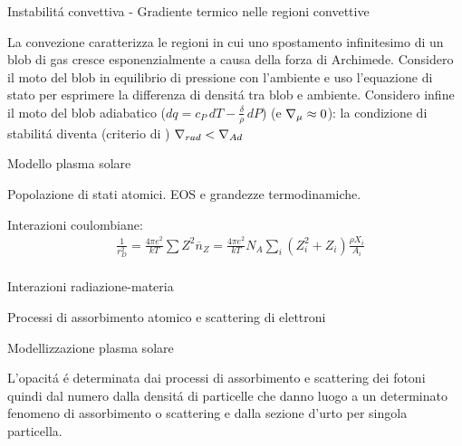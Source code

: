 \documentclass[10pt,xcolor={usenames},fleqn,mathserif,serif]{beamer}
\begin{document}
\begin{wordonframe}{Instabilit\'a convettiva - Gradiente termico nelle regioni convettive}

La convezione caratterizza le regioni in cui uno spostamento infinitesimo di un blob di gas cresce esponenzialmente a causa della forza di Archimede. Considero il moto del blob in equilibrio di pressione con l'ambiente e uso l'equazione di stato per esprimere la differenza di densit\'a tra blob e ambiente. Considero infine il moto del blob adiabatico ($dq=c_P\,dT-\frac{\delta}{\rho}\,dP$) (e $\nabla_{\mu}{}\approx0$): la condizione di stabilit\'a diventa (criterio di \sch{}) $\nabla_{rad}{}<\nabla_{Ad}{}$

\end{wordonframe}



\begin{frame}{Modello plasma solare}

\begin{block}{Popolazione di stati atomici. EOS e grandezze termodinamiche.}

Interazioni coulombiane:
\begin{align*}
&\frac{1}{r_D^2}=\frac{4\pi e^2}{kT}\sum Z^2\overline{n}_Z=\frac{4\pi e^2}{kT}N_A\sum_{i}(Z_i^2+Z_i)\frac{\rho X_i}{A_i}\\
\end{align*}

\end{block}

\begin{block}{Interazioni radiazione-materia}

Processi di assorbimento atomico e scattering di elettroni

\end{block}

\end{frame}

\begin{wordonframe}{Modellizzazione plasma solare}

L'opacit\'a \'e determinata dai processi di assorbimento e scattering dei fotoni quindi dal numero dalla densit\'a di particelle che danno luogo a un determinato fenomeno di assorbimento o scattering e dalla sezione d'urto per singola particella.

\end{wordonframe}
\end{document}
